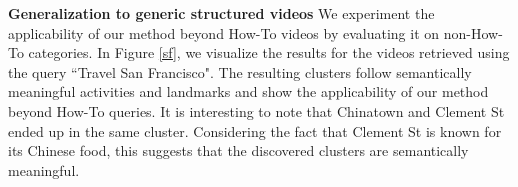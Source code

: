 \vspace{1mm}
\noindent\textbf{Generalization to generic structured videos}
We experiment the applicability of our method beyond How-To videos by evaluating it on non-How-To categories. In Figure \ref{sf}, we visualize the results for the videos retrieved using the query ``Travel San Francisco". The resulting clusters follow semantically meaningful activities and landmarks and show the applicability of our method beyond How-To queries. It is interesting to note that Chinatown and Clement St ended up in the same cluster. Considering the fact that Clement St is known for its Chinese food, this suggests that the discovered clusters are semantically meaningful.
\vspace{-2mm}
